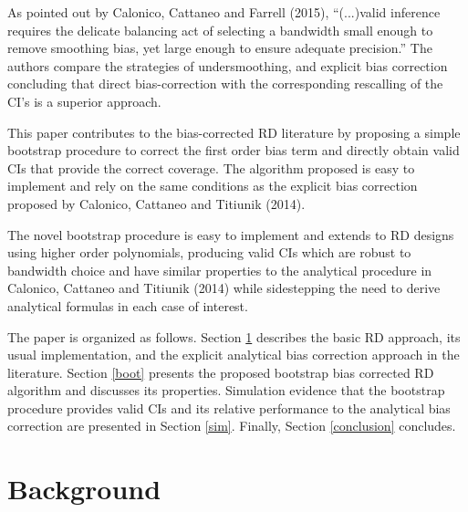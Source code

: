 \documentclass[12pt,fleqn]{article}
\begin{document}
As pointed out by Calonico, Cattaneo and Farrell (2015), ``(...)valid inference
requires the delicate balancing act of selecting a bandwidth small enough
to remove smoothing bias, yet large enough to ensure adequate precision.''
The authors compare the strategies of undersmoothing, and explicit bias 
correction concluding that direct bias-correction with the corresponding 
rescalling of the CI's is a superior approach.

This paper contributes to the bias-corrected RD literature by proposing a simple
bootstrap procedure to correct the first order bias term and directly obtain 
valid CIs that provide the correct coverage. The algorithm proposed is easy to
implement and rely on the same conditions as the explicit bias correction
proposed by Calonico, Cattaneo and Titiunik (2014).

The novel bootstrap procedure is easy to implement and extends to RD designs 
using higher order polynomials, producing valid CIs which are robust to 
bandwidth choice and have similar properties to the analytical procedure in 
Calonico, Cattaneo and Titiunik (2014) while sidestepping the need to derive 
analytical formulas in each case of interest.

The paper is organized as follows. Section \ref{background} describes the basic
RD approach, its usual implementation, and the explicit analytical bias 
correction approach in the literature. Section \ref{boot} presents the proposed 
bootstrap bias corrected RD algorithm and discusses its properties. Simulation
evidence that the bootstrap procedure provides valid CIs and its relative 
performance to the analytical bias correction are presented in Section \ref{sim}.
Finally, Section \ref{conclusion} concludes.

\section{Background}\label{background}
\end{document}
